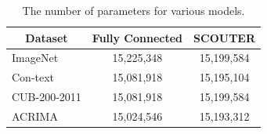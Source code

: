 \begin{table}[!ht]
\centering
\begin{tabular}{l|c|c}
\hline
\multicolumn{1}{c|}{\textbf{Dataset}} & \textbf{Fully Connected} & \textbf{SCOUTER} \\ \hline
ImageNet                              & 15,225,348               & 15,199,584       \\
Con-text                              & 15,081,918               & 15,195,104       \\
CUB-200-2011                          & 15,081,918               & 15,199,584       \\
ACRIMA                                & 15,024,546               & 15,193,312       \\ \hline
\end{tabular}
\vspace{3mm}
\caption{The number of parameters for various models.}
\label{tab:num_param}
\end{table}


